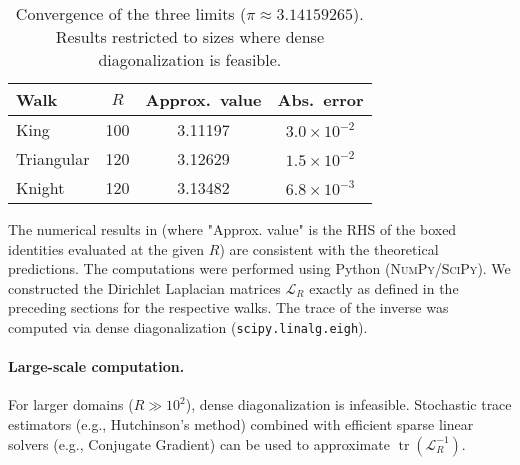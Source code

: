 \documentclass{article}
\numberwithin{equation}{section}
\theoremstyle{definition}
\theoremstyle{remark}
\DeclareMathOperator{\tr}{tr}
\begin{document}
\begin{table}[h]
\centering
\caption{Convergence of the three limits ($\pi\approx3.14159265$). Results restricted to sizes where dense diagonalization is feasible.}
\label{tab:numeric_pi}
\begin{tabular}{@{}lccc@{}}
\toprule
Walk & $R$ & Approx.\ value & Abs.\ error \\
\midrule
King & 100 & 3.11197 & $3.0 \times 10^{-2}$ \\
\addlinespace
Triangular & 120 & 3.12629 & $1.5\times10^{-2}$ \\
\addlinespace
Knight & 120 & 3.13482 & $6.8\times10^{-3}$ \\
\bottomrule
\end{tabular}
\end{table}

The numerical results in  (where "Approx. value" is the RHS of the boxed identities evaluated at the given $R$) are consistent with the theoretical predictions. The computations were performed using Python (\textsc{NumPy}/\textsc{SciPy}). We constructed the Dirichlet Laplacian matrices $\mathcal{L}_R$ exactly as defined in the preceding sections for the respective walks. The trace of the inverse was computed via dense diagonalization (\texttt{scipy.linalg.eigh}).

\paragraph{Large-scale computation.} For larger domains ($R \gg 10^2$), dense diagonalization is infeasible. Stochastic trace estimators (e.g., Hutchinson's method) combined with efficient sparse linear solvers (e.g., Conjugate Gradient) can be used to approximate $\tr(\mathcal{L}_R^{-1})$.
\end{document}
